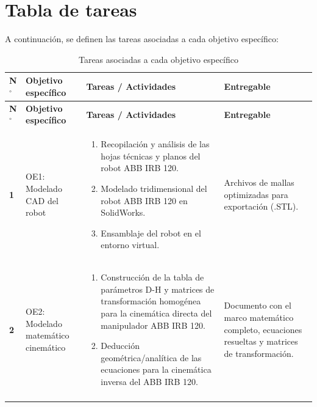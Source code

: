 \documentclass[11pt,oneside]{report}
\begin{document}
\chapter{Tabla de tareas}

A continuación, se definen las tareas asociadas a cada objetivo específico:

{\small
\setlength{\tabcolsep}{4pt}
\begin{longtable}{>{\centering\arraybackslash}p{}
                  >{\raggedright\arraybackslash}p{}
                  >{\raggedright\arraybackslash}p{}
                  >{\raggedright\arraybackslash}p{}}
\caption{Tareas asociadas a cada objetivo específico}\\
\toprule
\rowcolor{UniPrimary!12}
\textbf{N$^\circ$} & \textbf{Objetivo específico} & \textbf{Tareas / Actividades} & \textbf{Entregable} \\
\midrule
\endfirsthead
\toprule
\rowcolor{UniPrimary!12}
\textbf{N$^\circ$} & \textbf{Objetivo específico} & \textbf{Tareas / Actividades} & \textbf{Entregable} \\
\midrule
\endhead
\bottomrule
\endfoot

\textbf{1} & OE1: Modelado CAD del robot &
\begin{enumerate}[nosep,leftmargin=*]
  \item Recopilación y análisis de las hojas técnicas y planos del robot ABB IRB 120.
  \item Modelado tridimensional del robot ABB IRB 120 en SolidWorks.
  \item Ensamblaje del robot en el entorno virtual.
\end{enumerate}
& Archivos de mallas optimizadas para exportación (.STL). \\
\addlinespace

\textbf{2} & OE2: Modelado matemático cinemático &
\begin{enumerate}[nosep,leftmargin=*]
  \item Construcción de la tabla de parámetros D-H y matrices de transformación homogénea para la cinemática directa del manipulador ABB IRB 120.
  \item Deducción geométrica/analítica de las ecuaciones para la cinemática inversa del ABB IRB 120.
\end{enumerate}
& Documento con el marco matemático completo, ecuaciones resueltas y matrices de transformación. \\
\addlinespace


\end{longtable}}
\end{document}
